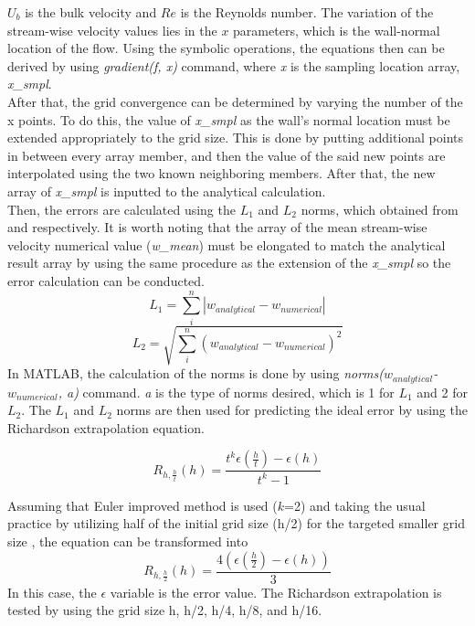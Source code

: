 \documentclass[11pt]{article}
\begin{document}
\noindent $U_b$ is the bulk velocity and $Re$ is the Reynolds number. The variation of the stream-wise velocity values lies in the $x$ parameters, which is the wall-normal location of the flow. Using the symbolic operations, the equations then can be derived by using \textit{gradient(f, x)} command, where \textit{x} is the sampling location array, \textit{x\_smpl}. \\
\newline
 \noindent After that, the grid convergence can be determined by varying the number of the x points. To do this, the value of \textit{x\_smpl} as the wall's normal location must be extended appropriately to the grid size. This is done by putting additional points in between every array member, and then the value of the said new points are interpolated using the two known neighboring members. After that, the new array of \textit{x\_smpl} is inputted to the analytical calculation. \\
 \newline
 \noindent Then, the errors are calculated using the $L_1$ and $L_2$ norms, which obtained from \citet{WolframL1} and \citet{WolframL2} respectively. It is worth noting that the array of the mean stream-wise velocity numerical value (\textit{w\_mean}) must be elongated to match the analytical result array by using the same procedure as the extension of the \textit{x\_smpl} so the error calculation can be conducted.
\begin{equation}
    L_1=\sum^n_i{|{w_{analytical}-w_{numerical}}|}
\end{equation}
\begin{equation}
    L_2=\sqrt{\sum^n_i{(w_{analytical}-w_{numerical})^2}}
\end{equation}
In MATLAB, the calculation of the norms is done by using \textit{norms($w_{analytical}$-$w_{numerical}$, a)} command. \textit{a} is the type of norms desired, which is 1 for $L_1$ and 2 for $L_2$. The $L_1$ and $L_2$ norms are then used for predicting the ideal error by using the Richardson extrapolation equation.

\begin{equation}
    R_{h, \frac{h}{t}}(h) = \frac{t^k \epsilon\left(\frac ht\right) - \epsilon(h)}{t^k -1}
\end{equation}

\noindent Assuming that Euler improved method is used ($k$=2) and taking the usual practice by utilizing half of the initial grid size (h/2) for the targeted smaller grid size \citep{Feldman2000}, the equation can be transformed into
\begin{equation}
    R_{h, \frac{h}{2}}(h) = \frac{4\left(\epsilon\left(\frac h2\right) - \epsilon(h)\right)}{3}
\end{equation}
In this case, the $\epsilon$ variable is the error value. The Richardson extrapolation is tested by using the grid size h, h/2, h/4, h/8, and h/16.
\end{document}
